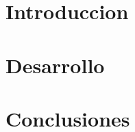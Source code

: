 \documentclass[10pt, a4paper]{article}
\begin{document}

\tableofcontents
\pagebreak
\section{Introduccion}

\pagebreak
\section{Desarrollo}

\pagebreak
\section{Conclusiones}

\end{document}
